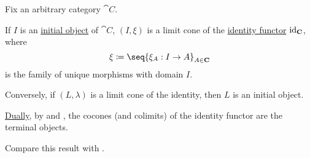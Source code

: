\begin{proposition}\label{thm:limits_of_identity_functor}
  Fix an arbitrary category \( \cat{C} \).

  \begin{thmenum}
     If \( I \) is an \hyperref[def:universal_objects/initial]{initial object} of \( \cat{C} \), \( (I, \xi) \) is a limit cone of the \hyperref[eq:def:category_of_small_categories/identity]{identity functor} \( \operatorname{id}_{\operatorname{\mathbf{C}}} \), where
    \begin{equation*}
      \xi \coloneqq \seq{ \xi_A: I \to A }_{A \in \cat{C}}
    \end{equation*}
    is the family of unique morphisms with domain \( I \).

     Conversely, if \( (L, \lambda) \) is a limit cone of the identity, then \( L \) is an initial object.
  \end{thmenum}

  \hyperref[thm:categorical_principle_of_duality]{Dually}, by  and , the cocones (and colimits) of the identity functor are the terminal objects.

  Compare this result with .
\end{proposition}
